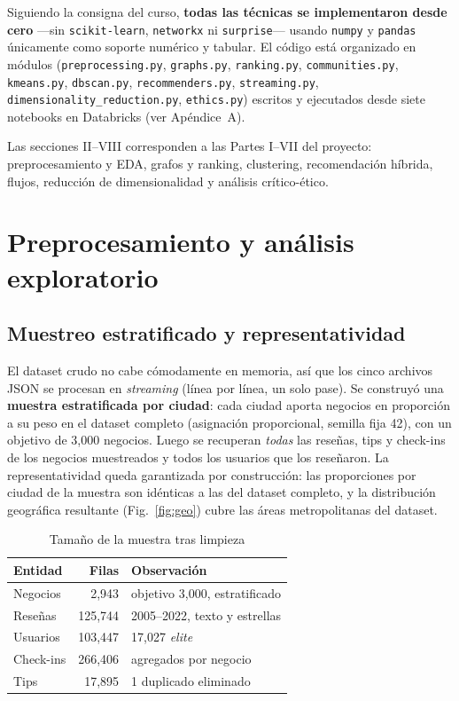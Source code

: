 \documentclass[conference]{IEEEtran}
\begin{document}
Siguiendo la consigna del curso, \textbf{todas las técnicas se implementaron desde cero} ---sin \texttt{scikit-learn}, \texttt{networkx} ni \texttt{surprise}--- usando \texttt{numpy} y \texttt{pandas} únicamente como soporte numérico y tabular. El código está organizado en módulos (\texttt{preprocessing.py}, \texttt{graphs.py}, \texttt{ranking.py}, \texttt{communities.py}, \texttt{kmeans.py}, \texttt{dbscan.py}, \texttt{recommenders.py}, \texttt{streaming.py}, \texttt{dimensionality\_reduction.py}, \texttt{ethics.py}) escritos y ejecutados desde siete notebooks en Databricks (ver Apéndice~A).

Las secciones II--VIII corresponden a las Partes I--VII del proyecto: preprocesamiento y EDA, grafos y ranking, clustering, recomendación híbrida, flujos, reducción de dimensionalidad y análisis crítico-ético.

\section{Preprocesamiento y análisis exploratorio}

\subsection{Muestreo estratificado y representatividad}
El dataset crudo no cabe cómodamente en memoria, así que los cinco archivos JSON se procesan en \emph{streaming} (línea por línea, un solo pase). Se construyó una \textbf{muestra estratificada por ciudad}: cada ciudad aporta negocios en proporción a su peso en el dataset completo (asignación proporcional, semilla fija 42), con un objetivo de 3{,}000 negocios. Luego se recuperan \emph{todas} las reseñas, tips y check-ins de los negocios muestreados y todos los usuarios que los reseñaron. La representatividad queda garantizada por construcción: las proporciones por ciudad de la muestra son idénticas a las del dataset completo, y la distribución geográfica resultante (Fig.~\ref{fig:geo}) cubre las áreas metropolitanas del dataset.

\begin{table}[H]
  \caption{Tamaño de la muestra tras limpieza}
  \centering
  \footnotesize
  \setlength{\tabcolsep}{4pt}
  \begin{tabular}{lrl}
    \toprule
    Entidad & Filas & Observación \\
    \midrule
    Negocios  & 2{,}943   & objetivo 3{,}000, estratificado \\
    Reseñas   & 125{,}744 & 2005--2022, texto y estrellas \\
    Usuarios  & 103{,}447 & 17{,}027 \emph{elite} \\
    Check-ins & 266{,}406 & agregados por negocio \\
    Tips      & 17{,}895  & 1 duplicado eliminado \\
    \bottomrule
  \end{tabular}
  \label{tab:muestra}
\end{table}
\end{document}
